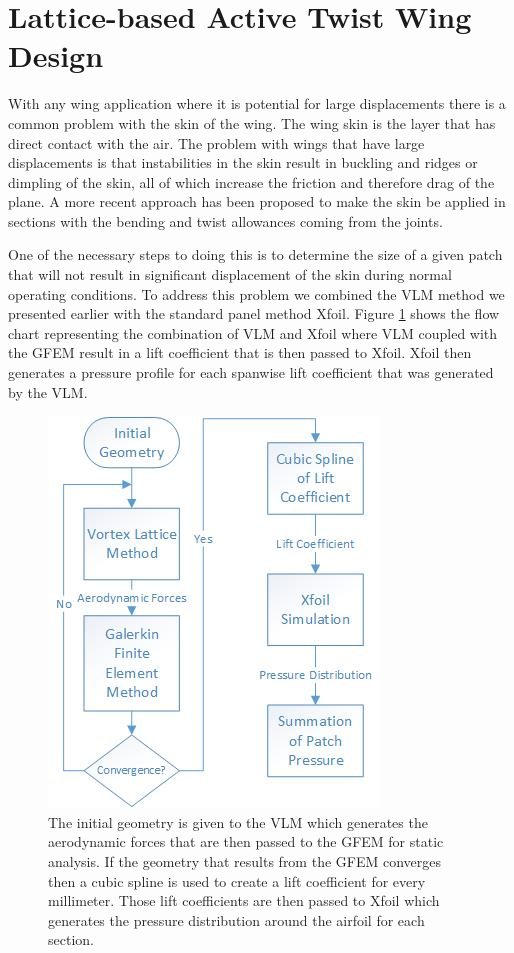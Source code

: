 \documentclass[11pt]{ucthesis}
\begin{document}
\section{Lattice-based Active Twist Wing Design}
With any wing application where it is potential for large displacements there is a common problem with the skin of the wing. The wing skin is the layer that has direct contact with the air. The problem with wings that have large displacements is that instabilities in the skin result in buckling and ridges or dimpling of the skin, all of which increase the friction and therefore drag of the plane. A more recent approach has been proposed to make the skin be applied in sections with the bending and twist allowances coming from the joints.

One of the necessary steps to doing this is to determine the size of a given patch that will not result in significant displacement of the skin during normal operating conditions. To address this problem we combined the VLM method we presented earlier with the standard panel method Xfoil. Figure \ref{fig:PPFlow} shows the flow chart representing the combination of VLM and Xfoil where VLM coupled with the GFEM result in a lift coefficient that is then passed to Xfoil. Xfoil then generates a pressure profile for each spanwise lift coefficient that was generated by the VLM.
\begin{figure}[h]
\centering
\includegraphics[width=0.3\linewidth]{Figures/PatchPressureFlowChart.jpg}
\caption{The initial geometry is given to the VLM which generates the aerodynamic forces that are then passed to the GFEM for static analysis. If the geometry that results from the GFEM converges then a cubic spline is used to create a lift coefficient for every millimeter. Those lift coefficients are then passed to Xfoil which generates the pressure distribution around the airfoil for each section.}
\label{fig:PPFlow}
\end{figure}
\end{document}
